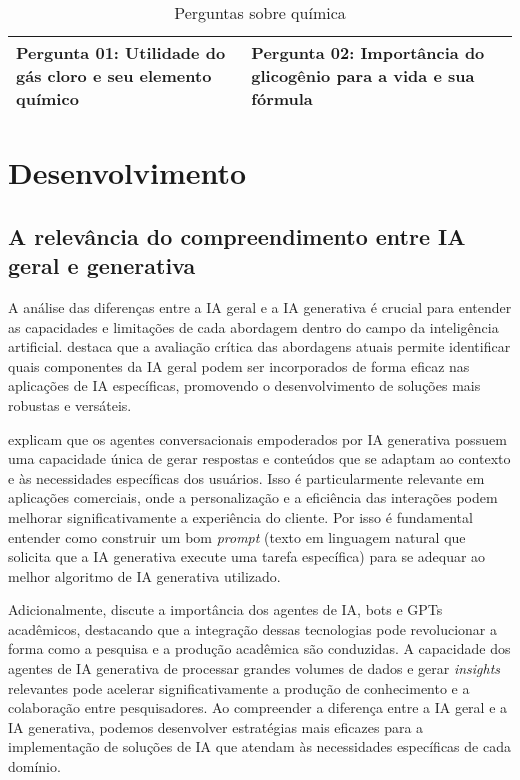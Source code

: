 \documentclass{article}
\begin{document}
\begin{table}[h!]
    \centering
    \begin{tabular}{|p{6cm}|p{6cm}|}
    \hline
    \textbf{Pergunta 01:} Utilidade do gás cloro e 
    seu elemento químico & 
    \textbf{Pergunta 02:} Importância do glicogênio 
    para a vida e sua fórmula \\
    \hline
    \end{tabular}
    \caption{Perguntas sobre química}
    \label{tab:ia_cloro_glicogenio}
\end{table}

\section{Desenvolvimento}

\subsection{A relevância do compreendimento entre IA geral e generativa}

\hspace{0.5cm}A análise das diferenças entre a IA geral e a IA generativa é crucial para entender as capacidades e limitações de cada abordagem dentro do campo da inteligência artificial. \cite{Teahan2010} destaca que a avaliação crítica das abordagens atuais permite identificar quais componentes da IA geral podem ser incorporados de forma eficaz nas aplicações de IA específicas, promovendo o desenvolvimento de soluções mais robustas e versáteis.

\cite{Mariani2023} explicam que os agentes conversacionais empoderados por IA generativa possuem uma capacidade única de gerar respostas e conteúdos que se adaptam ao contexto e às necessidades específicas dos usuários. Isso é particularmente relevante em aplicações comerciais, onde a personalização e a eficiência das interações podem melhorar significativamente a experiência do cliente. Por isso é fundamental entender como construir um bom \textit{prompt} (texto em linguagem natural que solicita que a IA generativa execute uma tarefa específica) para se adequar ao melhor algoritmo de IA generativa utilizado.

Adicionalmente, \cite{Sampaio2024} discute a importância dos agentes de IA, bots e GPTs acadêmicos, destacando que a integração dessas tecnologias pode revolucionar a forma como a pesquisa e a produção acadêmica são conduzidas. A capacidade dos agentes de IA generativa de processar grandes volumes de dados e gerar \textit{insights} relevantes pode acelerar significativamente a produção de conhecimento e a colaboração entre pesquisadores. Ao compreender a diferença entre a IA geral e a IA generativa, podemos desenvolver estratégias mais eficazes para a implementação de soluções de IA que atendam às necessidades específicas de cada domínio.
\end{document}
